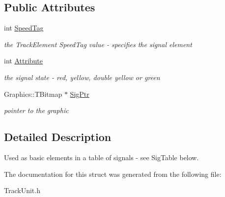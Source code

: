 \subsection*{Public Attributes}
\begin{DoxyCompactItemize}
\item 
\mbox{\label{struct_t_track_1_1_t_sig_element_a34471e55de8fcc915046b28706156071}} 
int \mbox{\hyperlink{struct_t_track_1_1_t_sig_element_a34471e55de8fcc915046b28706156071}{Speed\+Tag}}
\begin{DoxyCompactList}\small\item\em the Track\+Element Speed\+Tag value -\/ specifies the signal element \end{DoxyCompactList}\item 
\mbox{\label{struct_t_track_1_1_t_sig_element_aaf0195d7519c41c5f2acc57c07b6fb83}} 
int \mbox{\hyperlink{struct_t_track_1_1_t_sig_element_aaf0195d7519c41c5f2acc57c07b6fb83}{Attribute}}
\begin{DoxyCompactList}\small\item\em the signal state -\/ red, yellow, double yellow or green \end{DoxyCompactList}\item 
\mbox{\label{struct_t_track_1_1_t_sig_element_a8e0002e65092d0c2f40adc3980de42c3}} 
Graphics\+::\+T\+Bitmap $\ast$ \mbox{\hyperlink{struct_t_track_1_1_t_sig_element_a8e0002e65092d0c2f40adc3980de42c3}{Sig\+Ptr}}
\begin{DoxyCompactList}\small\item\em pointer to the graphic \end{DoxyCompactList}\end{DoxyCompactItemize}


\subsection{Detailed Description}
Used as basic elements in a table of signals -\/ see Sig\+Table below. 

The documentation for this struct was generated from the following file\+:\begin{DoxyCompactItemize}
\item 
Track\+Unit.\+h\end{DoxyCompactItemize}
